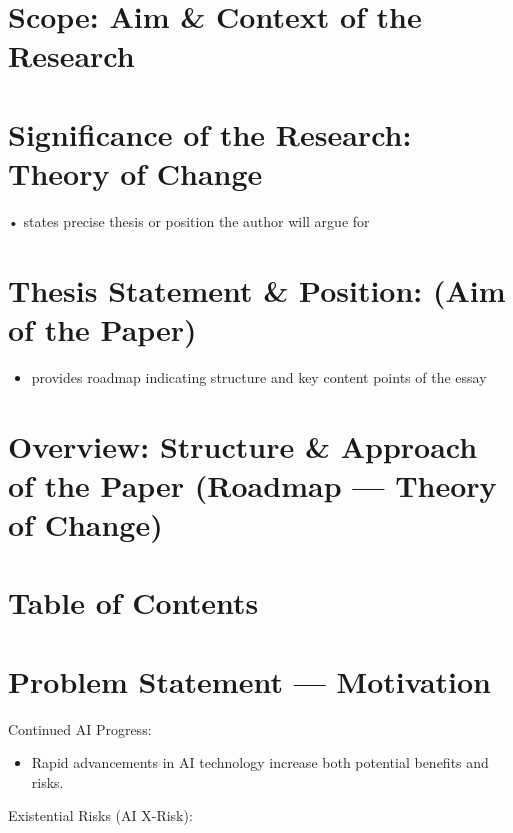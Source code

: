 \documentclass[
  letterpaper,
]{book}
\providecommand{\tightlist}{%
  \setlength{\itemsep}{0pt}\setlength{\parskip}{0pt}}
\begin{document}
\section{Scope: Aim \& Context of the
Research}\label{scope-aim-context-of-the-research}

\section{Significance of the Research: Theory of
Change}\label{significance-of-the-research-theory-of-change}

• states precise thesis or position the author will argue for

\section{Thesis Statement \& Position: (Aim of the
Paper)}\label{thesis-statement-position-aim-of-the-paper}

\begin{itemize}
\tightlist
\item
  provides roadmap indicating structure and key content points of the
  essay
\end{itemize}

\section{Overview: Structure \& Approach of the Paper (Roadmap ---
Theory of
Change)}\label{overview-structure-approach-of-the-paper-roadmap-theory-of-change}

\section{Table of Contents}\label{table-of-contents}

\section{Problem Statement ---
Motivation}\label{problem-statement-motivation}

Continued AI Progress:

\begin{itemize}
\tightlist
\item
  Rapid advancements in AI technology increase both potential benefits
  and risks.
\end{itemize}

Existential Risks (AI X-Risk):
\end{document}
